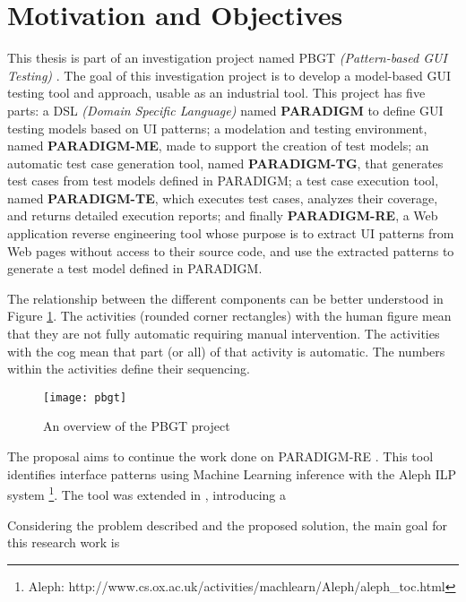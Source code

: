 \section{Motivation and Objectives} \label{sec:goals}
This thesis is part of an investigation project named PBGT \textit{(Pattern-based GUI Testing)} \cite{moreira2013pattern}. The goal of this investigation project is to develop a model-based GUI testing tool and approach, usable as an industrial tool. This project has five parts: a DSL \textit{(Domain Specific Language)} named \textbf{PARADIGM} to define GUI testing models based on UI patterns; a modelation and testing environment, named \textbf{PARADIGM-ME}, made to support the creation of test models; an automatic test case generation tool, named \textbf{PARADIGM-TG}, that generates test cases from test models defined in PARADIGM; a test case execution tool, named \textbf{PARADIGM-TE}, which executes test cases, analyzes their coverage, and returns detailed execution reports; and finally \textbf{PARADIGM-RE}, a Web application reverse engineering tool whose purpose is to extract UI patterns from Web pages without access to their source code, and use the extracted patterns to generate a test model defined in PARADIGM. 

The relationship between the different components can be better understood in Figure \ref{fig:pbgt}. The activities (rounded corner rectangles) with the human figure mean that they are not fully automatic requiring manual intervention. The activities with the cog mean that part (or all) of that activity is automatic. The numbers within the activities define their sequencing.

\begin{figure}[htb]
  \begin{center}
    \leavevmode
    \texttt{[image: pbgt]}
  	\caption{An overview of the PBGT project \cite{nabuco2013inferring}}
  	\label{fig:pbgt}
   \end{center}
\end{figure}

The proposal aims to continue the work done on PARADIGM-RE \cite{nabuco2013inferring}. This tool identifies interface patterns using Machine Learning inference with the Aleph ILP system \footnote{Aleph: http://www.cs.ox.ac.uk/activities/machlearn/Aleph/aleph\_toc.html}. The tool was extended in \cite{nabuco2014inferring}, introducing a 

Considering the problem described and the proposed solution, the main goal for this research work is

